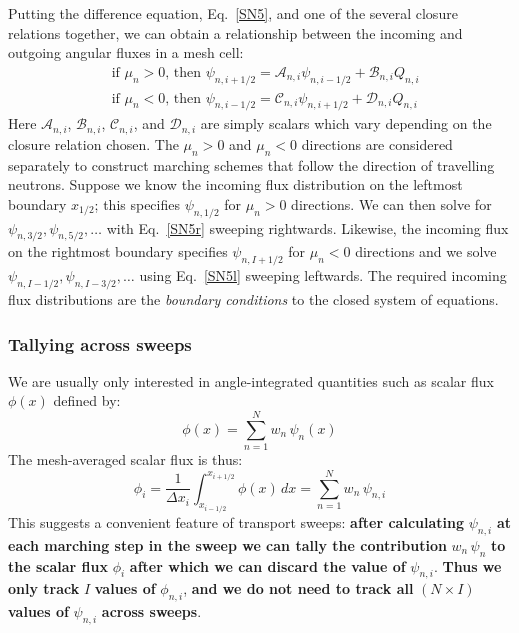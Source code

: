 \documentclass{article}
\begin{document}
Putting the difference equation, Eq.~\eqref{SN5}, and one of the several closure relations together, we can obtain a relationship between the incoming and outgoing angular fluxes in a mesh cell:
\begin{align}
    &\text{if }\mu_n>0\text{, then }\psi_{n,i+1/2}=\mathcal{A}_{n,i}\psi_{n,i-1/2}+\mathcal{B}_{n,i}Q_{n,i}\label{SN5r}\\
    &\text{if }\mu_n<0\text{, then }\psi_{n,i-1/2}=\mathcal{C}_{n,i}\psi_{n,i+1/2}+\mathcal{D}_{n,i}Q_{n,i}\label{SN5l}
\end{align}
Here $\mathcal{A}_{n,i}$, $\mathcal{B}_{n,i}$, $\mathcal{C}_{n,i}$, and $\mathcal{D}_{n,i}$ are simply scalars which vary depending on the closure relation chosen. The $\mu_n>0$ and $\mu_n<0$ directions are considered separately to construct marching schemes that follow the direction of travelling neutrons. Suppose we know the incoming flux distribution on the leftmost boundary $x_{1/2}$; this specifies $\psi_{n,1/2}$ for $\mu_n>0$ directions. We can then solve for $\psi_{n,3/2},\psi_{n,5/2},\dots$ with Eq.~\eqref{SN5r} sweeping rightwards. Likewise, the incoming flux on the rightmost boundary specifies $\psi_{n,I+1/2}$ for $\mu_n<0$ directions and we solve $\psi_{n,I-1/2},\psi_{n,I-3/2},\dots$ using Eq.~\eqref{SN5l} sweeping leftwards. The required incoming flux distributions are the \textit{boundary conditions} to the closed system of equations.
\subsubsection{Tallying across sweeps}
We are usually only interested in angle-integrated quantities such as scalar flux $\phi(x)$ defined by:
\begin{equation}
    \phi(x)=\sum_{n=1}^N w_n\,\psi_n(x)
\end{equation}
The mesh-averaged scalar flux is thus:
\begin{equation} \label{SN14}
    \phi_i=\frac{1}{\Delta x_i}\int_{x_{i-1/2}}^{x_{i+1/2}}\phi(x)\,dx=\sum_{n=1}^N w_n\,\psi_{n,i}
\end{equation}
This suggests a convenient feature of transport sweeps: \textbf{after calculating} $\psi_{n,i}$ \textbf{at each marching step in the sweep we can tally the contribution} $w_n\,\psi_{n}$ \textbf{to the scalar flux} $\phi_i$ \textbf{after which we can discard the value of} $\psi_{n,i}$. \textbf{Thus we only track} $I$ \textbf{values of} $\phi_{n,i}$, \textbf{and we do not need to track all} $(N\times I)$ \textbf{values of} $\psi_{n,i}$ \textbf{across sweeps}.
\end{document}
